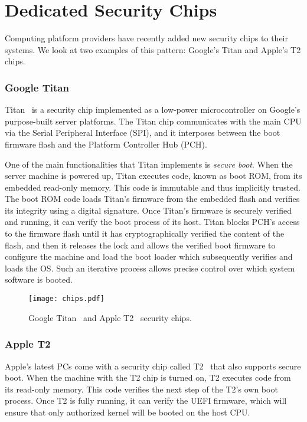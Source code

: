 \section*{Dedicated Security Chips}

Computing platform providers have recently added new security chips to their systems. We look at two examples of this pattern: Google's Titan and Apple's T2 chips.

\subsubsection*{Google Titan}

Titan~\cite{titan} is a security chip implemented as a low-power microcontroller on Google's purpose-built server platforms. The Titan chip communicates with the main CPU via the Serial Peripheral Interface (SPI), and it interposes between the boot firmware flash and the Platform Controller Hub (PCH).

 One of the main functionalities that Titan implements is \emph{secure boot}. When the server machine is powered up, Titan executes code, known as boot ROM, from its embedded read-only memory. This code is immutable and thus implicitly trusted. The boot ROM code loads Titan's firmware from the embedded flash and verifies its integrity using a digital signature. Once Titan's firmware is securely verified and running, it can verify the boot process of its host. Titan blocks PCH's access to the firmware flash until it has cryptographically verified the content of the flash, and then it releases the lock and allows the verified boot firmware to configure the machine and load the boot loader which subsequently verifies and loads the OS. Such an iterative process allows precise control over which system software is booted. 

\begin{figure}[t]
    \centering
    \texttt{[image: chips.pdf]}
    \caption{Google Titan~\cite{titan} and Apple T2~\cite{t2} security chips.}
\label{fig:prototype}   
\end{figure}

 
\subsubsection*{Apple T2}
 
Apple's latest PCs come with a security chip called T2~\cite{t2} that also supports secure boot. When the machine with the T2 chip is turned on, T2 executes code from its read-only memory. This code verifies the next step of the T2's own boot process. Once T2 is fully running, it can verify the UEFI firmware, which will ensure that only authorized kernel will be booted on the host CPU.

